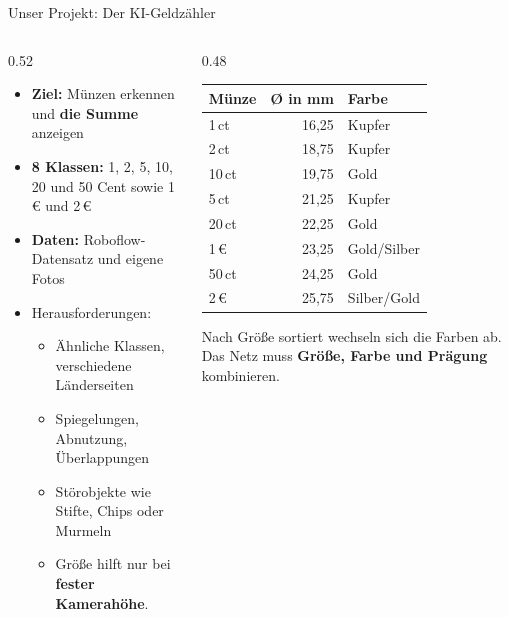 
\begin{frame}{Unser Projekt: Der KI-Geldzähler}
\footnotesize
{}
\begin{columns}
\begin{column}{0.52\textwidth}
\begin{itemize}
  \item \textbf{Ziel:} Münzen erkennen und \textbf{die Summe} anzeigen
  \item \textbf{8 Klassen:} 1, 2, 5, 10, 20 und 50 Cent sowie 1\,€ und 2\,€
  \item \textbf{Daten:} Roboflow-Datensatz und eigene Fotos
  \item Herausforderungen:
  \begin{itemize}
    \item Ähnliche Klassen, verschiedene Länderseiten
    \item Spiegelungen, Abnutzung, Überlappungen
    \item Störobjekte wie Stifte, Chips oder Murmeln
    \item Größe hilft nur bei \textbf{fester Kamerahöhe}.
  \end{itemize}
\end{itemize}
\end{column}
\begin{column}{0.48\textwidth}
\centering
\begin{tabular}{lrl}
\toprule
\textbf{Münze} & \textbf{Ø in mm} & \textbf{Farbe} \\
\midrule
1\,ct  & 16,25 & Kupfer \\
2\,ct  & 18,75 & Kupfer \\
10\,ct & 19,75 & Gold \\
5\,ct  & 21,25 & Kupfer \\
20\,ct & 22,25 & Gold \\
1\,€   & 23,25 & Gold/Silber \\
50\,ct & 24,25 & Gold \\
2\,€   & 25,75 & Silber/Gold \\
\bottomrule
\end{tabular}

\vspace{0.6em}
Nach Größe sortiert wechseln sich die Farben ab. Das Netz muss \textbf{Größe, Farbe und Prägung} kombinieren.
\end{column}
\end{columns}
\end{frame}


